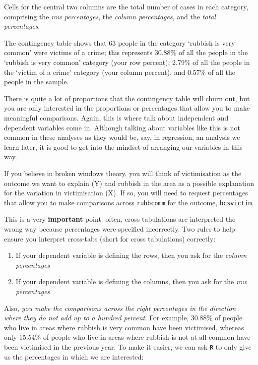 \documentclass[
]{book}
\begin{document}
Cells for the central two columns are the total number of cases in each category, comprising the \emph{row percentages}, the \emph{column percentages}, and the \emph{total percentages}.

The contingency table shows that 63 people in the category `rubbish is very common' were victims of a crime; this represents 30.88\% of all the people in the `rubbish is very common' category (your row percent), 2.79\% of all the people in the `victim of a crime' category (your column percent), and 0.57\% of all the people in the sample.

There is quite a lot of proportions that the contingency table will churn out, but you are only interested in the proportions or percentages that allow you to make meaningful comparisons. Again, this is where talk about independent and dependent variables come in. Although talking about variables like this is not common in these analyses as they would be, say, in regression, an analysis we learn later, it is good to get into the mindset of arranging our variables in this way.

If you believe in broken windows theory, you will think of victimisation as the outcome we want to explain (Y) and rubbish in the area as a possible explanation for the variation in victimisation (X). If so, you will need to request percentages that allow you to make comparisons across \texttt{rubbcomm} for the outcome, \texttt{bcsvictim}.

This is a very \textbf{important} point: often, cross tabulations are interpreted the wrong way because percentages were specified incorrectly. Two rules to help ensure you interpret cross-tabs (short for cross tabulations) correctly:

\begin{enumerate}
\def\labelenumi{\arabic{enumi}.}
\item
  If your dependent variable is defining the rows, then you ask for the \emph{column percentages}
\item
  If your dependent variable is defining the columns, then you ask for the \emph{row percentages}
\end{enumerate}

Also, \emph{you make the comparisons across the right percentages in the direction where they do not add up to a hundred percent}. For example, 30.88\% of people who live in areas where rubbish is very common have been victimised, whereas only 15.54\% of people who live in areas where rubbish is not at all common have been victimised in the previous year. To make it easier, we can ask \texttt{R} to only give us the percentages in which we are interested:
\end{document}
